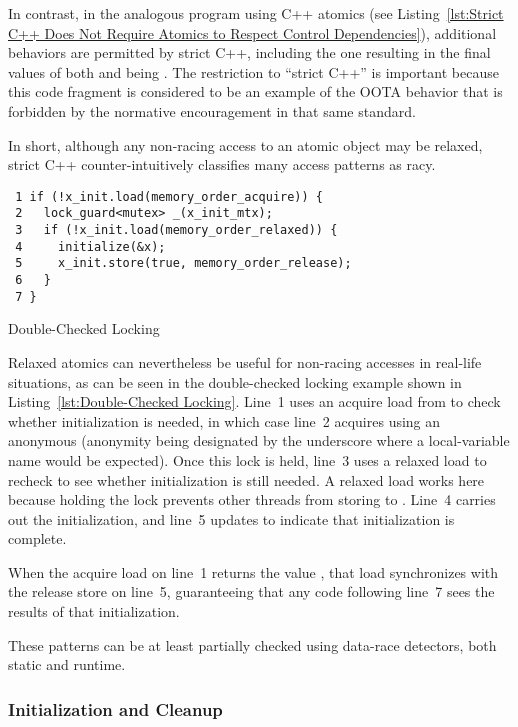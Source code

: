 \documentclass[10]{article}
\begin{document}
In contrast, in the analogous program using C++ atomics
(see Listing~\ref{lst:Strict C++ Does Not Require Atomics to Respect Control Dependencies}),
additional behaviors are permitted by strict C++,
including the one resulting in the final values of both 
and  being .
The restriction to ``strict C++'' is important because this code fragment
is considered to be an example of the OOTA behavior that is forbidden
by the normative encouragement in that same standard.

In short, although any non-racing access to an atomic object may be
relaxed, strict C++ counter-intuitively classifies many access patterns
as racy.

\begin{listing}[tbp]
\begin{verbatim}
 1 if (!x_init.load(memory_order_acquire)) {
 2   lock_guard<mutex> _(x_init_mtx);
 3   if (!x_init.load(memory_order_relaxed)) {
 4     initialize(&x);
 5     x_init.store(true, memory_order_release);
 6   }
 7 }
\end{verbatim}
\caption{Double-Checked Locking}
\label{lst:Double-Checked Locking}
\end{listing}

Relaxed atomics can nevertheless be useful for non-racing accesses
in real-life situations, as can be seen in the double-checked
locking example shown in
Listing~\ref{lst:Double-Checked Locking}.
Line~1 uses an acquire load from  to check whether
initialization is needed, in which case line~2 acquires 
using an anonymous  (anonymity being designated by the
underscore where a local-variable name would be expected).
Once this lock is held, line~3 uses a relaxed load to recheck 
to see whether initialization is still needed.
A relaxed load works here because holding the lock prevents other
threads from storing to .
Line~4 carries out the initialization, and line~5 updates 
to indicate that initialization is complete.

When the acquire load on line~1 returns the value , that
load synchronizes with the release store on line~5, guaranteeing
that any code following line~7 sees the results of that initialization.

These patterns can be at least partially checked using data-race
detectors, both static and runtime.

\subsubsection{Initialization and Cleanup}
\label{sec:Initialization and Cleanup}
\end{document}
